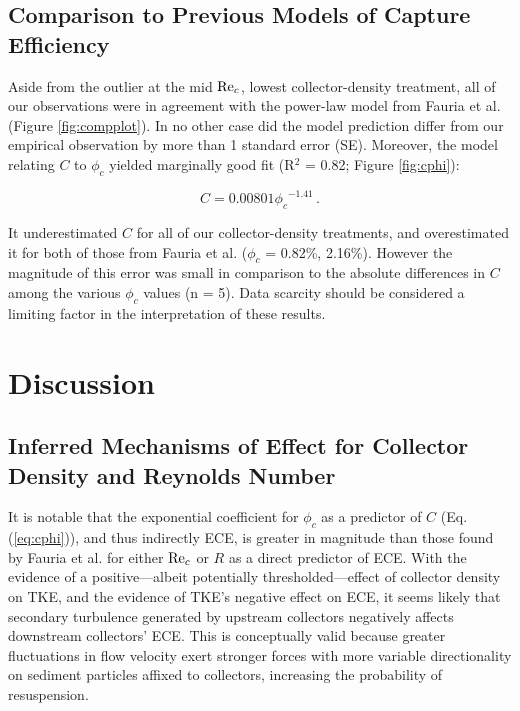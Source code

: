\documentclass[geosciences,article,submit,moreauthors,pdftex]{Definitions/mdpi}
\begin{document}
\subsection{Comparison to Previous Models of Capture Efficiency}

Aside from the outlier at the mid $\mathrm{Re}_c$, lowest collector-density treatment, all of our observations were in agreement with the power-law model from Fauria et al. \cite{Fauria_2015} (Figure \ref{fig:compplot}). In no other case did the model prediction differ from our empirical observation by more than 1 standard error (SE). Moreover, the model relating $C$ to $\phi_c$ yielded marginally good fit (R$^2$ = 0.82; Figure \ref{fig:cphi}):

\begin{equation}
    C = 0.00801{\phi_c}^{-1.41}\,.
    \label{eq:cphi}
\end{equation}

\noindent It underestimated $C$ for all of our collector-density treatments, and overestimated it for both of those from Fauria et al. ($\phi_c$ = 0.82\%, 2.16\%). However the magnitude of this error was small in comparison to the absolute differences in $C$ among the various $\phi_c$ values (n = 5). Data scarcity should be considered a limiting factor in the interpretation of these results.



\section{Discussion}

\subsection{Inferred Mechanisms of Effect for Collector Density and Reynolds Number}

It is notable that the exponential coefficient for $\phi_c$ as a predictor of $C$ (Eq. (\ref{eq:cphi})), and thus indirectly ECE, is greater in magnitude than those found by Fauria et al. \cite{Fauria_2015} for either $\mathrm{Re}_c$ or $R$ as a direct predictor of ECE. With the evidence of a positive---albeit potentially thresholded---effect of collector density on TKE, and the evidence of TKE's negative effect on ECE, it seems likely that secondary turbulence generated by upstream collectors negatively affects downstream collectors' ECE. This is conceptually valid because greater fluctuations in flow velocity exert stronger forces with more variable directionality on sediment particles affixed to collectors, increasing the probability of resuspension. 
\end{document}
